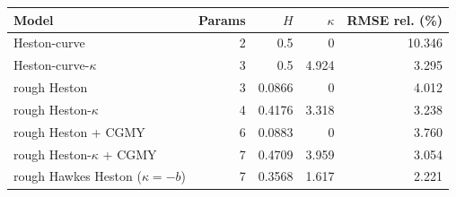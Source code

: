 \begin{tabular}{lrrrr}
\toprule
Model & Params & $H$ & $\kappa$ & RMSE rel. (\%)\\
\midrule
Heston-curve & 2 & 0.5 & 0 & 10.346\\
Heston-curve-$\kappa$ & 3 & 0.5 & 4.924 & 3.295\\
\addlinespace
rough Heston & 3 & 0.0866 & 0 & 4.012\\
rough Heston-$\kappa$ & 4 & 0.4176 & 3.318 & 3.238\\
\addlinespace
rough Heston + CGMY & 6 & 0.0883 & 0 & 3.760\\
rough Heston-$\kappa$ + CGMY & 7 & 0.4709 & 3.959 & 3.054\\
\addlinespace
rough Hawkes Heston ($\kappa=-b$) & 7 & 0.3568 & 1.617 & 2.221\\
\bottomrule
\end{tabular}
